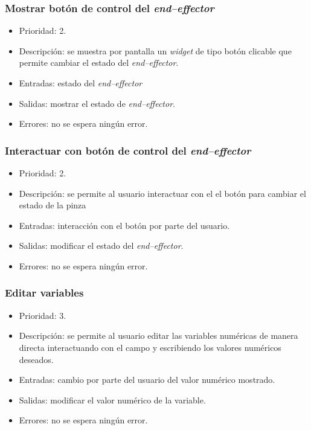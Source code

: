 \subsubsection{Mostrar botón de control del \textit{end--effector}}
\begin{itemize}
    \item Prioridad: 2.
    \item Descripción: se muestra por pantalla un \textit{widget} de tipo botón clicable que permite cambiar el estado del \textit{end--effector}.
    \item Entradas: estado del \textit{end--effector}
    \item Salidas: mostrar el estado de \textit{end--effector}.
    \item Errores: no se espera ningún error.
\end{itemize}

\subsubsection{Interactuar con botón de control del \textit{end--effector}}
\begin{itemize}
    \item Prioridad: 2.
    \item Descripción: se permite al usuario interactuar con el el botón para cambiar el estado de la pinza
    \item Entradas: interacción con el botón por parte del usuario.
    \item Salidas: modificar el estado del \textit{end--effector}.
    \item Errores: no se espera ningún error.
\end{itemize}

\subsubsection{Editar variables}
\begin{itemize}
    \item Prioridad: 3.
    \item Descripción: se permite al usuario editar las variables numéricas de manera directa interactuando con el campo y escribiendo los valores numéricos deseados.
    \item Entradas: cambio por parte del usuario del valor numérico mostrado.
    \item Salidas: modificar el valor numérico de la variable.
    \item Errores: no se espera ningún error.
\end{itemize}

